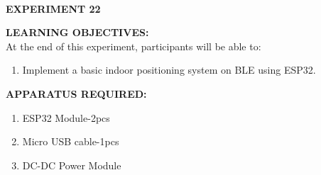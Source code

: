 \documentclass[12pt,a4paper]{article}
\begin{document}
\begin{center}

\textbf{\large \\EXPERIMENT 22 }\\[6pt]
\end{center}

\textbf{\large LEARNING OBJECTIVES:}\\[3pt]
At the end of this experiment, participants will be able to:\vspace{-6mm}\begin{enumerate}
\setlength\itemsep{-0.3em}
\item Implement a basic indoor positioning system on BLE using ESP32.  \\
\end{enumerate}

\textbf{\large APPARATUS REQUIRED:}\\
\vspace{-3mm}
\begin{enumerate}
 \setlength\itemsep{-0.3em}
\item ESP32 Module-2pcs \\
\item Micro USB cable-1pcs\\
\item DC-DC Power Module
\end{enumerate}
\end{document}
